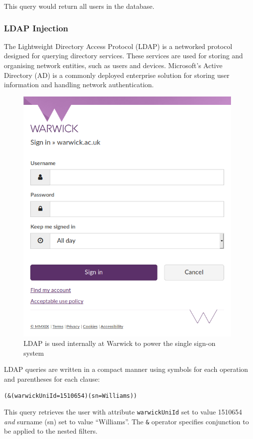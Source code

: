 \documentclass[a4paper,openany,12pt]{book}
\begin{document}
This query would return all users in the database.

\subsubsection{LDAP Injection}

The Lightweight Directory Access Protocol (LDAP) is a networked protocol designed for querying directory services.
These services are used for storing and organising network entities, such as users and devices.
Microsoft's Active Directory (AD) is a commonly deployed enterprise solution for storing user information and handling
network authentication.

\begin{figure}[H]
    \begin{MyMdframed}
        \vspace{0.5em}


        \caption{\label{figure:wso}LDAP is used internally at Warwick to power the single sign-on system}
        \vspace{0.5em}
        \captionsetup{style=default}
        \begin{center}
            \includegraphics[width=0.5\linewidth]{wso.png}
        \end{center}
    \end{MyMdframed}
\end{figure}

LDAP queries are written in a compact manner using symbols for each operation and parentheses for each clause:

\texttt{(\&(warwickUniId=1510654)(sn=Williams))}

This query retrieves the user with attribute \texttt{warwickUniId} set to value 1510654 \emph{and} surname (sn) set to value
``Williams''.
The \texttt{\&} operator specifies conjunction to be applied to the nested filters.
\end{document}
